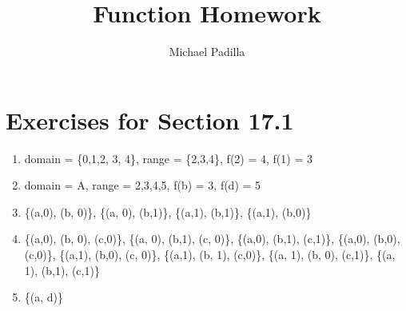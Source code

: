 \documentclass[12pt]{article}
\title{Function Homework}
\author{Michael Padilla}
\begin{document}
 
\maketitle
\section*{Exercises for Section 17.1}
\begin{enumerate}
    \item domain = \{0,1,2, 3, 4\}, range = \{2,3,4\}, f(2) = 4, f(1) = 3
    \item domain = A, range = {2,3,4,5}, f(b) = 3, f(d) = 5
    \item  \{(a,0), (b, 0)\}, \{(a, 0), (b,1)\}, \{(a,1), (b,1)\}, \{(a,1), (b,0)\}
    \item \{(a,0), (b, 0), (c,0)\}, \{(a, 0), (b,1), (c, 0)\}, \{(a,0), (b,1), (c,1)\}, \{(a,0), (b,0), (c,0)\}, \{(a,1), (b,0), (c, 0)\}, \{(a,1), (b, 1), (c,0)\}, \{(a, 1), (b, 0), (c,1)\}, \{(a, 1), (b,1), (c,1)\} 
    \item  \{(a, d)\}
\end{enumerate}
\end{document}
